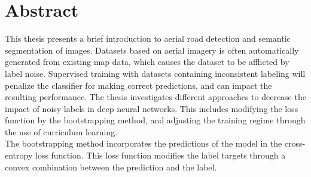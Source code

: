 \documentclass[a4paper]{book}
\newcommand{\thesisAuthor}{Olav Kåre Vatne}
\newcommand{\thesisTitle}{Detecting roads in aerial imagery}
\newcommand{\thesisType}{master project}
\newcommand{\thesisDate}{spring 2016}
\begin{document}







\frontmatter

\clearpage

\section*{Abstract}
This thesis presents a brief introduction to aerial road detection and semantic segmentation of images. Datasets based on aerial imagery is often automatically generated from existing map data, which causes the dataset to be afflicted by label noise. Supervised training with datasets containing inconsistent labeling will penalize the classifier for making correct predictions, and can impact the resulting performance. The thesis investigates different approaches to decrease the impact of noisy labels in deep neural networks. This includes modifying the loss function by the bootstrapping method, and adjusting the training regime through the use of curriculum learning.\\

The bootstrapping method incorporates the predictions of the model in the cross-entropy loss function. This loss function modifies the label targets through a convex combination between the prediction and the label.\\
\end{document}
